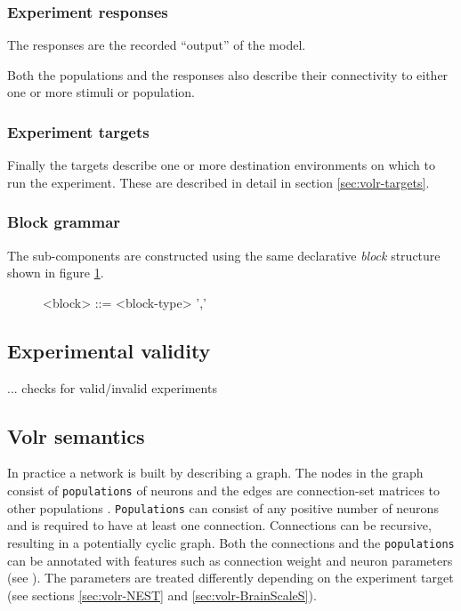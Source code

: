 \subsubsection{Experiment responses}
The responses are the recorded ``output'' of the model.

Both the populations
and the responses also describe their connectivity to either one or more
stimuli or population.

\subsubsection{Experiment targets}
Finally the targets describe one or more destination environments on which
to run the experiment. These are described in detail in section \ref{sec:volr-targets}.

\subsubsection{Block grammar}
The sub-components are constructed using the same declarative \textit{block}
structure shown in figure \ref{fig:volr-ebnf-block}.

\begin{figure}
  \label{fig:volr-ebnf-block}
  \begin{grammar}
    <block> ::= <block-type> ','
  \end{grammar}
\end{figure}


\subsection{Experimental validity}
... checks for valid/invalid experiments

\subsection{Volr semantics}
In practice a network is built by describing a graph.
The nodes in the graph consist of \texttt{populations} of neurons and the edges
are connection-set matrices to other populations \autocite{Djurfeldt2012}.
\texttt{Populations} can consist of any positive number of neurons and is
required to have at least one connection.
Connections can be recursive, resulting in a potentially cyclic graph.
Both the connections and the \texttt{populations} can be annotated with features
such as connection weight and neuron parameters (see ).
The parameters are treated differently depending on the experiment target (see
sections \ref{sec:volr-NEST} and \ref{sec:volr-BrainScaleS}).

